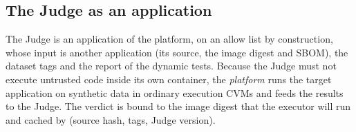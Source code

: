 \subsection{The Judge as an application}\label{sec:design-judge}
The Judge is an application of the platform, on an allow list by construction, whose input is
another application (its source, the image digest and SBOM), the dataset tags and the report of
the dynamic tests. Because the Judge must not execute untrusted code inside its own container, the
\emph{platform} runs the target application on synthetic data in ordinary execution CVMs and feeds
the results to the Judge. The verdict is bound to the image digest that the executor will run and
cached by (source hash, tags, Judge version).
